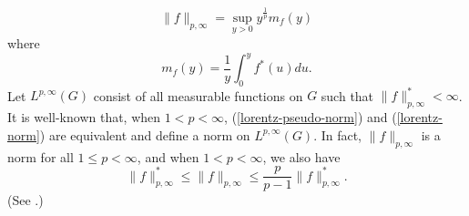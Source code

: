 \begin{equation}
\| f\|_{p,\infty}=\sup_{y>0}
y^\frac{1}{p}  m_f (y)
\label{lorentz-norm}
\end{equation} 
where 
$$ m_f(y)=\frac{1}{y} \int_0^y f^*(u)du.$$
Let $L^{p,\infty}(G)$ consist of 
all measurable functions on $G$ such that
$\| f\|^*_{p,\infty}<\infty$.
It is well-known that, when $1<p<\infty$,
(\ref{lorentz-pseudo-norm}) and  (\ref{lorentz-norm})
are equivalent and define a norm on
$L^{p,\infty}(G)$.  
In fact, $\| f\|_{p,\infty}$ is a norm
for all $1\leq p <\infty$, and when
$1<p<\infty$, we also have
\begin{equation}
\| f\|^*_{p,\infty} \leq  \| f\|_{p,\infty} 
\leq
\frac{p}{p-1} \| f\|^*_{p,\infty}.
\label{equivalent-lorentz}
\end{equation} 
(See \cite[Chap. V, Theorem 3.21]{sw}.)\\

